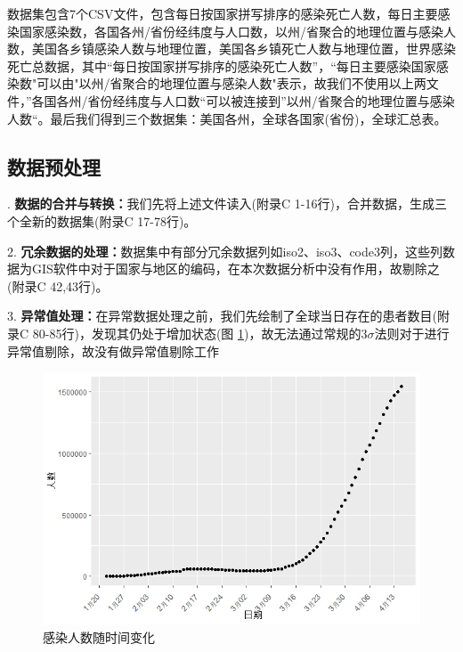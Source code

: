 \documentclass[a4paper, 11pt,twoside=true,UTF8]{scrartcl}
\begin{document}
数据集包含7个CSV文件，包含每日按国家拼写排序的感染死亡人数，每日主要感染国家感染数，各国各州/省份经纬度与人口数，以州/省聚合的地理位置与感染人数，美国各乡镇感染人数与地理位置，美国各乡镇死亡人数与地理位置，世界感染死亡总数据，其中“每日按国家拼写排序的感染死亡人数”，“每日主要感染国家感染数"可以由"以州/省聚合的地理位置与感染人数"表示，故我们不使用以上两文件，”各国各州/省份经纬度与人口数“可以被连接到”以州/省聚合的地理位置与感染人数“。最后我们得到三个数据集：美国各州，全球各国家(省份)，全球汇总表。

\subsection{数据预处理}
. \textbf{数据的合并与转换：}我们先将上述文件读入(附录C 1-16行)，合并数据，生成三个全新的数据集(附录C 17-78行)。

2. \textbf{冗余数据的处理：}数据集中有部分冗余数据列如iso2、iso3、code3列，这些列数据为GIS软件中对于国家与地区的编码，在本次数据分析中没有作用，故剔除之(附录C 42,43行)。

3. \textbf{异常值处理：}在异常数据处理之前，我们先绘制了全球当日存在的患者数目(附录C 80-85行)，发现其仍处于增加状态(图 \ref{P3F1})，故无法通过常规的$3\sigma$法则对于进行异常值剔除，故没有做异常值剔除工作

\begin{figure}[h]
	\small
	\centering
	\includegraphics[width=13cm]{P3F1}
	\caption{感染人数随时间变化} \label{P3F1}
\end{figure}
\end{document}
